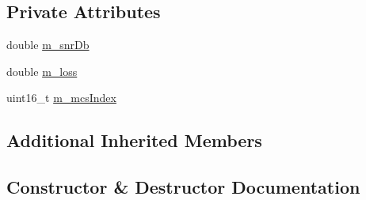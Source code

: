 \subsection*{Private Attributes}
\begin{DoxyCompactItemize}
\item 
double \hyperlink{classLteLinkAdaptationTestCase_ae48411edbef532314f5031f8a5371cca}{m\+\_\+snr\+Db}
\item 
double \hyperlink{classLteLinkAdaptationTestCase_a6506f5bd0db4467756819735634a3237}{m\+\_\+loss}
\item 
uint16\+\_\+t \hyperlink{classLteLinkAdaptationTestCase_aa3bde4e95bfaf9a596550cf476c3cfc5}{m\+\_\+mcs\+Index}
\end{DoxyCompactItemize}
\subsection*{Additional Inherited Members}


\subsection{Constructor \& Destructor Documentation}
